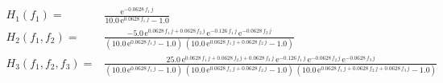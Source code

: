 \begin{align} 
 \scriptstyle H_1(f_1) =& \scriptstyle\frac{\mathrm{e}^{- 0.0628\, f_1\, j}}{10.0\, \mathrm{e}^{0.0628\, f_1\, j} - 1.0}\\ 
 \scriptstyle H_2(f_1,f_2) =& \scriptstyle\frac{- 5.0\, \mathrm{e}^{0.0628\, f_1\, j + 0.0628\, f_2\, j}\, \mathrm{e}^{- 0.126\, f_1\, j}\, \mathrm{e}^{- 0.0628\, f_2\, j}}{\left(10.0\, \mathrm{e}^{0.0628\, f_1\, j} - 1.0\right)\, \left(10.0\, \mathrm{e}^{0.0628\, f_1\, j + 0.0628\, f_2\, j} - 1.0\right)}\\ 
 \scriptstyle H_3(f_1,f_2,f_3) =& \scriptstyle\frac{25.0\, \mathrm{e}^{0.0628\, f_1\, j + 0.0628\, f_2\, j + 0.0628\, f_3\, j}\, \mathrm{e}^{- 0.126\, f_1\, j}\, \mathrm{e}^{- 0.0628\, f_2\, j}\, \mathrm{e}^{- 0.0628\, f_3\, j}}{\left(10.0\, \mathrm{e}^{0.0628\, f_1\, j} - 1.0\right)\, \left(10.0\, \mathrm{e}^{0.0628\, f_1\, j + 0.0628\, f_2\, j} - 1.0\right)\, \left(10.0\, \mathrm{e}^{0.0628\, f_1\, j + 0.0628\, f_2\, j + 0.0628\, f_3\, j} - 1.0\right)}
\end{align}